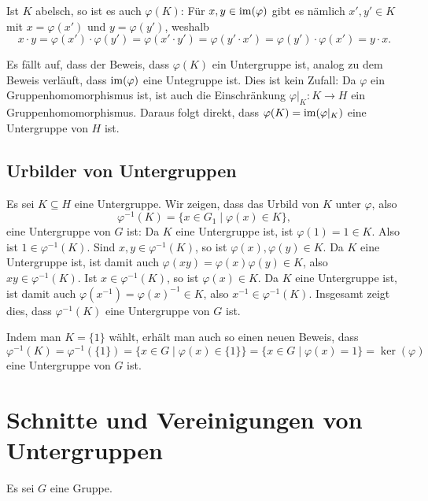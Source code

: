 Ist $K$ abelsch, so ist es auch $\varphi(K)$: Für $x,y \in \mathrm{im}(\varphi)$ gibt es nämlich $x', y' \in K$ mit $x = \varphi(x')$ und $y = \varphi(y')$, weshalb
\[
 x \cdot y
 = \varphi(x') \cdot \varphi(y')
 = \varphi(x' \cdot y')
 = \varphi(y' \cdot x')
 = \varphi(y') \cdot \varphi(x')
 = y \cdot x.
\]


\begin{bem}
 Es fällt auf, dass der Beweis, dass $\varphi(K)$ ein Untergruppe ist, analog zu dem Beweis verläuft, dass $\mathrm{im}(\varphi)$ eine Untegruppe ist. Dies ist kein Zufall: Da $\varphi$ ein Gruppenhomomorphismus ist, ist auch die Einschränkung $\varphi|_K \colon K \to H$ ein Gruppenhomomorphismus. Daraus folgt direkt, dass $\varphi(K) = \mathrm{im}(\varphi|_K)$ eine Untergruppe von $H$ ist.
\end{bem}



\subsection{Urbilder von Untergruppen}
Es sei $K \subseteq H$ eine Untergruppe. Wir zeigen, dass das Urbild von $K$ unter $\varphi$, also
\[
 \varphi^{-1}(K) = \{x \in G_1 \mid \varphi(x) \in K\},
\]
eine Untergruppe von $G$ ist: Da $K$ eine Untergruppe ist, ist $\varphi(1) = 1 \in K$. Also ist $1 \in \varphi^{-1}(K)$. Sind $x,y \in \varphi^{-1}(K)$, so ist $\varphi(x), \varphi(y) \in K$. Da $K$ eine Untergruppe ist, ist damit auch $\varphi(xy) = \varphi(x)\varphi(y) \in K$, also $xy \in \varphi^{-1}(K)$. Ist $x \in \varphi^{-1}(K)$, so ist $\varphi(x) \in K$. Da $K$ eine Untergruppe ist, ist damit auch $\varphi(x^{-1}) = \varphi(x)^{-1} \in K$, also $x^{-1} \in \varphi^{-1}(K)$. Insgesamt zeigt dies, dass $\varphi^{-1}(K)$ eine Untergruppe von $G$ ist.


\begin{bem}
 Indem man $K = \{1\}$ wählt, erhält man auch so einen neuen Beweis, dass
 \[
  \varphi^{-1}(K)
  = \varphi^{-1}(\{1\})
  = \{x \in G \mid \varphi(x) \in \{1\}\}
  = \{x \in G \mid \varphi(x) = 1\}
  = \ker(\varphi)
 \]
 eine Untergruppe von $G$ ist.
\end{bem}





\section{Schnitte und Vereinigungen von Untergruppen}
Es sei $G$ eine Gruppe.


